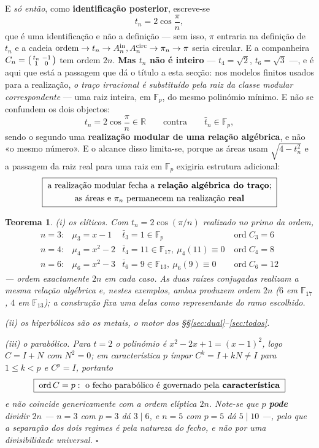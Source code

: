 \documentclass[11pt,a4paper]{article}
\newtheorem{teorema}{Teorema}
\begin{document}
\noindent E \emph{só então}, como \textbf{identificação posterior}, escreve-se
\[
t_n=2\cos\frac{\pi}{n},
\]
que é uma identificação e não a definição --- sem isso, $\pi$ entraria na
definição de $t_n$ e a cadeia
$\text{ordem}\to t_n\to A_n^{\rm in},A_n^{\rm circ}\to\pi_n\to\pi$
seria circular. E a companheira
$C_n=\begin{psmallmatrix}t_n&-1\\1&0\end{psmallmatrix}$ tem ordem $2n$. \textbf{Mas $t_n$ não é inteiro} --- $t_4=\sqrt2$, $t_6=\sqrt3$ ---,
e é aqui que está a passagem que dá o título a esta secção: nos modelos finitos
usados para a realização, \emph{o traço irracional é substituído pela raiz da
classe modular correspondente} --- uma raiz inteira, em $\mathbb{F}_p$, do mesmo
polinómio mínimo. E não se confundem os dois objectos:
\[
t_n=2\cos\frac{\pi}{n}\in\mathbb{R}
\qquad\text{contra}\qquad
\bar t_n\in\mathbb{F}_p ,
\]
sendo o segundo uma \textbf{realização modular de uma relação algébrica}, e não
«o mesmo número». E o alcance disso limita-se, porque as áreas usam
$\sqrt{4-t_n^{2}}$ e a passagem da raiz real para uma raiz em $\mathbb{F}_p$ exigiria
estrutura adicional:
\[
\boxed{\;\begin{gathered}
\text{a realização modular fecha a \textbf{relação algébrica do traço};}\\
\text{as áreas e }\pi_n\text{ permanecem na realização \textbf{real}}
\end{gathered}\;}
\]

\begin{teorema}\label{thm:pi}
\emph{(i) os elíticos.} Com $t_n=2\cos(\pi/n)$ realizado no primo da ordem,
\[
\begin{array}{llll}
n=3: & \mu_3=x-1 & \bar t_3=1\in\mathbb{F}_p & \operatorname{ord}C_3=6\\
n=4: & \mu_4=x^{2}-2 & \bar t_4=11\in\mathbb{F}_{17},\ \mu_4(11)\equiv0
     & \operatorname{ord}C_4=8\\
n=6: & \mu_6=x^{2}-3 & \bar t_6=9\in\mathbb{F}_{13},\ \mu_6(9)\equiv0
     & \operatorname{ord}C_6=12
\end{array}
\]
--- ordem exactamente $2n$ em cada caso. As duas raízes conjugadas realizam a
\emph{mesma relação algébrica} e, nestes exemplos, ambas produzem ordem $2n$ ($6$
em $\mathbb{F}_{17}$, $4$ em $\mathbb{F}_{13}$); a construção fixa uma delas como
representante do ramo escolhido.

\emph{(ii) os hiperbólicos} são os metais, o motor dos
\S\S\ref{sec:dual}--\ref{sec:todos}.

\emph{(iii) o parabólico.} Para $t=2$ o polinómio é $x^{2}-2x+1=(x-1)^{2}$, logo
$C=I+N$ com $N^{2}=0$; em característica $p$ ímpar $C^{k}=I+kN\neq I$ para
$1\leq k<p$ e $C^{p}=I$, portanto
\[
\boxed{\;\operatorname{ord}C=p:\ \text{o fecho parabólico é governado pela
\textbf{característica}}\;}
\]
e \emph{não} coincide genericamente com a ordem elíptica $2n$. Note-se que $p$
\textbf{pode} dividir $2n$ --- $n=3$ com $p=3$ dá $3\mid6$, e $n=5$ com $p=5$ dá
$5\mid10$ ---, pelo que a separação dos dois regimes é pela \emph{natureza do
fecho}, e não por uma divisibilidade universal. $\square$
\end{teorema}
\end{document}

